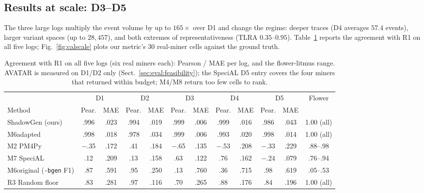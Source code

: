 \documentclass[runningheads]{llncs}
\begin{document}
{\color{chgblue}
\subsection{Results at scale: D3--D5}
\label{sec:eval:scale}
The three large logs multiply the event volume by up to $165\times$ over D1 and change the regime: deeper traces (D4 averages $57.4$ events), larger variant spaces (up to $28{,}457$), and both extremes of representativeness (TLRA $0.35$--$0.95$). Table~\ref{tab:scale} reports the agreement with R1 on all five logs; Fig.~\ref{fig:calscale} plots our metric's 30 real-miner cells against the ground truth.

\begin{table}[t]
\centering
\caption{Agreement with R1 on all five logs (six real miners each): Pearson / MAE per log, and the flower-litmus range. AVATAR is measured on D1/D2 only (Sect.~\ref{sec:eval:feasibility}); the SpeciAL D5 entry covers the four miners that returned within budget; M4/M8 return too few cells to rank.}
\label{tab:scale}
\setlength{\tabcolsep}{2.2pt}
\scriptsize
\begin{tabular}{@{}l cc cc cc cc cc c@{}}
\toprule
 & \multicolumn{2}{c}{D1} & \multicolumn{2}{c}{D2} & \multicolumn{2}{c}{D3} & \multicolumn{2}{c}{D4} & \multicolumn{2}{c}{D5} & Flower \\
\cmidrule(lr){2-3}\cmidrule(lr){4-5}\cmidrule(lr){6-7}\cmidrule(lr){8-9}\cmidrule(lr){10-11}
Method & Pear. & MAE & Pear. & MAE & Pear. & MAE & Pear. & MAE & Pear. & MAE & \\
\midrule
ShadowGen (ours) & .996 & .023 & .994 & .019 & .999 & .006 & .999 & .016 & .986 & .043 & 1.00 (all) \\
M6adapted & .998 & .018 & .978 & .034 & .999 & .006 & .993 & .020 & .998 & .014 & 1.00 (all) \\
M2 PM4Py & $-$.35 & .172 & .41 & .184 & $-$.65 & .135 & $-$.53 & .208 & $-$.33 & .229 & .88--.98 \\
M7 SpeciAL & .12 & .209 & .13 & .158 & .63 & .122 & .76 & .162 & $-$.24 & .079 & .76--.94 \\
M6original (\texttt{-bgen} F1) & .87 & .591 & .95 & .250 & .13 & .760 & .36 & .715 & .98 & .619 & .05--.53 \\
R3 Random floor & .83 & .281 & .97 & .116 & .70 & .265 & .88 & .176 & .84 & .196 & 1.00 (all) \\
\bottomrule
\end{tabular}
\end{table}

}
\end{document}

